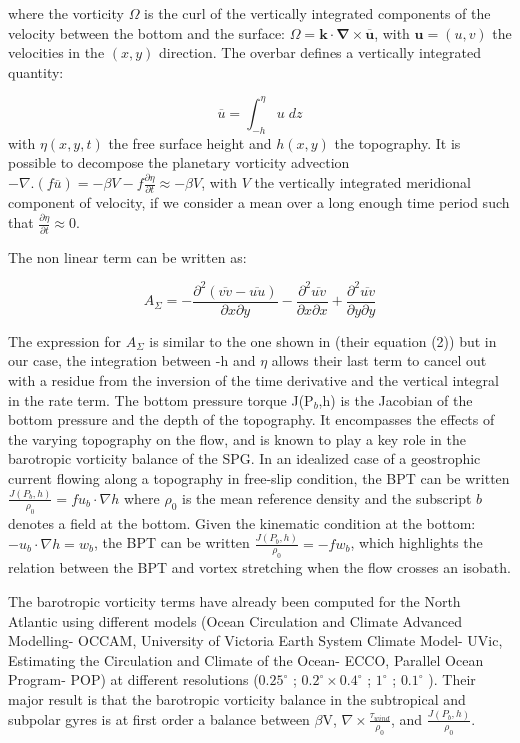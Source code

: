 \documentclass[os, manuscript]{copernicus}
\begin{document}
where the vorticity $\Omega$ is the curl of the vertically integrated components of the velocity between the bottom and the surface: $\Omega = \mathbf{k} \cdot \mathbf{\nabla} \times \overline{\mathbf{u}}$, with $\mathbf{u} = (u,v)$ the velocities in the $(x,y)$ direction. The overbar defines a vertically integrated quantity:

\begin{equation}
\overline{u}=\int^{\eta}_{-h} u \; dz
\end{equation}
with $\eta(x,y,t)$ the free surface height and $h(x,y)$ the topography. It is possible to decompose the planetary vorticity advection $-\nabla.(f\overline{u})=-\beta V-f \frac{\partial \eta}{\partial t}\approx - \beta V$, with $V$ the vertically integrated meridional component of velocity, if we consider a mean over a long enough time period such that $\frac{\partial \eta}{\partial t} \approx 0$.

The non linear term can be written as:

\begin{equation}
A_{\Sigma}= -\frac{\partial ^2 (\overline{vv}-\overline{uu})}{\partial x \partial y}-\frac{\partial ^2 \overline{uv}}{\partial x \partial x} +\frac{\partial ^2 \overline{uv}}{\partial y \partial y}
\end{equation}

The expression for $A_{\Sigma}$ is similar to the one shown in \citet{schoonover2016} (their equation (2)) but in our case, the integration between -h and $\eta$ allows their last term to cancel out with a residue from the inversion of the time derivative and the vertical integral in the rate term. The bottom pressure torque J(P$_b$,h) is the Jacobian of the bottom pressure and the depth of the topography. It encompasses the effects of the varying topography on the flow, and is known to play a key role in the barotropic vorticity balance of the SPG. In an idealized case of a geostrophic current flowing along a topography in free-slip condition, the BPT can be written $\frac{J(P_b,h)}{\rho _0}=f u_b \cdot \nabla h$ where $\rho_0$ is the mean reference density and the subscript $b$ denotes a field at the bottom. Given the kinematic condition at the bottom: $-u_b \cdot \nabla h =w_b$, the BPT can be written $\frac{J(P_b,h)}{\rho _0}=-fw_b$, which highlights the relation between the BPT and vortex stretching when the flow crosses an isobath.

The barotropic vorticity terms have already been computed for the North Atlantic using different models (Ocean Circulation and Climate Advanced Modelling- OCCAM, University of Victoria Earth System Climate Model- UVic, Estimating the Circulation and Climate of the Ocean- ECCO, Parallel Ocean Program- POP) at different resolutions ($0.25^{\circ}$ \citeauthor[2001]{hughes2001}; $0.2^{\circ}\times 0.4^{\circ}$ \citeauthor[2012]{spence2012}; $1^{\circ}$ \citeauthor[2019]{sonnewald2019}; $0.1^{\circ}$ \citeauthor[2015]{yeager2015}). Their major result is that the barotropic vorticity balance in the subtropical and subpolar gyres is at first order a balance between $\beta$V, $\nabla \times \frac{\tau _{wind}}{\rho_{0}}$, and $\frac{J(P_b,h)}{\rho _0}$. 
\end{document}
